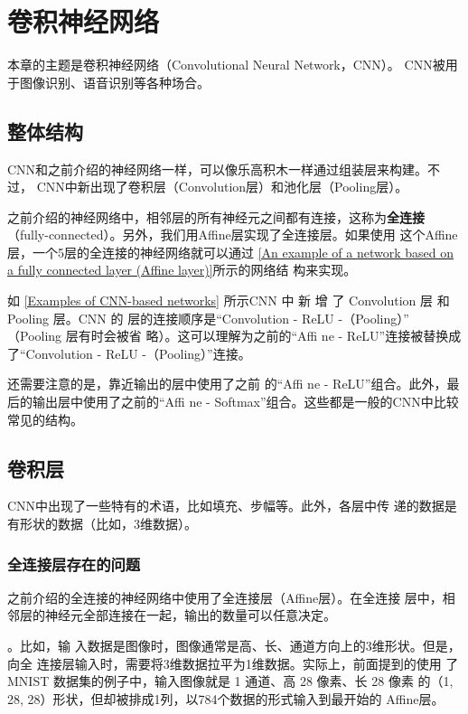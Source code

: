 \chapter{卷积神经网络}
本章的主题是卷积神经网络（Convolutional Neural Network，CNN）。
CNN被用于图像识别、语音识别等各种场合。
\section{整体结构}
CNN和之前介绍的神经网络一样，可以像乐高积木一样通过组装层来构建。不过，
CNN中新出现了卷积层（Convolution层）和池化层（Pooling层）。

之前介绍的神经网络中，相邻层的所有神经元之间都有连接，这称为\textbf{全连接}（fully-connected）。另外，我们用Affine层实现了全连接层。如果使用
这个Affine层，一个5层的全连接的神经网络就可以通过 \autoref{An example of a network based on a fully connected layer (Affine layer)}所示的网络结
构来实现。



如 \autoref{Examples of CNN-based networks} 所示CNN 中 新 增 了 Convolution 层 和 Pooling 层。CNN 的
层的连接顺序是“Convolution - ReLU -（Pooling）”
（Pooling 层有时会被省
略）。这可以理解为之前的“Affi ne - ReLU”连接被替换成了“Convolution -
ReLU -（Pooling）”连接。

还需要注意的是，靠近输出的层中使用了之前
的“Affi ne - ReLU”组合。此外，最后的输出层中使用了之前的“Affi ne -
Softmax”组合。这些都是一般的CNN中比较常见的结构。

\section{卷积层}
CNN中出现了一些特有的术语，比如填充、步幅等。此外，各层中传
递的数据是有形状的数据（比如，3维数据）。

\subsection{全连接层存在的问题}
之前介绍的全连接的神经网络中使用了全连接层（Affine层）。在全连接
层中，相邻层的神经元全部连接在一起，输出的数量可以任意决定。

。比如，输
入数据是图像时，图像通常是高、长、通道方向上的3维形状。但是，向全
连接层输入时，需要将3维数据拉平为1维数据。实际上，前面提到的使用
了 MNIST 数据集的例子中，输入图像就是 1 通道、高 28 像素、长 28 像素
的（1, 28, 28）形状，但却被排成1列，以784个数据的形式输入到最开始的
Affine层。

